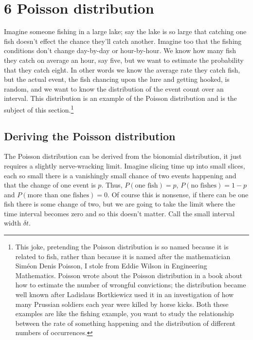 \documentclass[11pt,a4paper]{scrartcl}
\begin{document}
\section*{6 Poisson distribution}

Imagine someone fishing in a large lake; say the lake is so large that
catching one fish doesn't effect the chance they'll catch
another. Imagine too that the fishing conditions don't change
day-by-day or hour-by-hour. We know how many fish they catch on
average an hour, say five, but we want to estimate the probability
that they catch eight. In other words we know the average rate they
catch fish, but the actual event, the fish chancing upon the lure and
getting hooked, is random, and we want to know the distribution of the
event count over an interval. This distribution is an example of the
Poisson distribution and is the subject of this section.\footnote{This
  joke, pretending the Poisson distribution is so named because it is
  related to fish, rather than because it is named after the
  mathematician Sim\'{e}on Denis Poisson, I stole from Eddie Wilson in
  Engineering Mathematics. Poisson wrote about the Poisson
  distribution in a book about how to estimate the number of wrongful
  convictions; the distribution became well known after Ladislaus
  Bortkiewicz used it in an investigation of how many Prussian
  soldiers each year were killed by horse kicks. Both these examples
  are like the fishing example, you want to study the relationship
  between the rate of something happening and the distribution of
  different numbers of occurrences.}

\subsection*{Deriving the Poisson distribution}

The Poisson distribution can be derived from the bionomial
distribution, it just requires a slightly nerve-wracking
limit. Imagine slicing time up into small slices, each so small there
is a vanishingly small chance of two events happening and that the
change of one event is $p$. Thus, $P(\mbox{one fish})=p$, $P(\mbox{no
  fishes})=1-p$ and $P(\mbox{more than one fishes})=0$. Of course this
is nonsense, if there can be one fish there is some change of two, but
we are going to take the limit where the time interval becomes zero
and so this doesn't matter. Call the small interval width $\delta t$.
\end{document}
